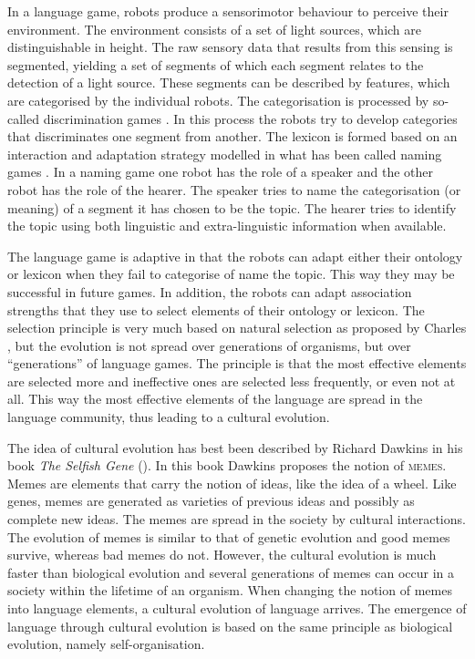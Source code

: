 In a language game, robots produce a sensorimotor behaviour to perceive their environment. The environment consists of a set of light sources, which are distinguishable in height. The raw sensory data that results from this sensing is segmented, yielding a set of segments of which each segment relates to the detection of a light source. These segments can be described by features, which are categorised by the individual robots. The categorisation is processed by so-called {\sc discrimination games} \citep{steels:1996b}. In this process the robots try to develop categories that discriminates one segment from another. The lexicon is formed based on an interaction and adaptation strategy modelled in what has been called {\sc naming games} \citep{steels:1996a}. In a naming game one robot has the role of a speaker and the other robot has the role of the hearer. The speaker tries to name the categorisation (or meaning) of a segment it has chosen to be the topic. The hearer tries to identify the topic using both linguistic and extra-linguistic information when available.


The language game is adaptive in that the robots can adapt either their ontology or lexicon when they fail to categorise of name the topic. This way they may be successful in future games. In addition, the robots can adapt association strengths that they use to select elements of their ontology or lexicon. The selection principle is very much based on natural selection as proposed by Charles \citet{darwin:1968}, but the evolution is not  spread over generations of organisms, but over ``generations'' of language games. The principle is that the most effective elements are selected more and ineffective ones are selected less frequently, or even not at all. This way the most effective elements of the language are spread in the language community, thus leading to a cultural evolution.

The idea of cultural evolution has best been described by Richard Dawkins in his book {\em The Selfish Gene} (\citeyear{dawkins:1976}). In this book Dawkins proposes the notion of {\scshape memes}. Memes are elements that carry the notion of ideas, like the idea of a wheel. Like genes, memes are generated as varieties of previous ideas and possibly as complete new ideas. The memes are spread in the society by cultural interactions. The evolution of memes is similar to that of genetic evolution and good memes survive, whereas bad memes do not. However, the cultural evolution is much faster than biological evolution and several generations of memes can occur in a society within the lifetime of an organism. When changing the notion of memes into language elements, a cultural evolution of language arrives. The emergence of language through cultural evolution is based on the same principle as biological evolution, namely self-organisation.


